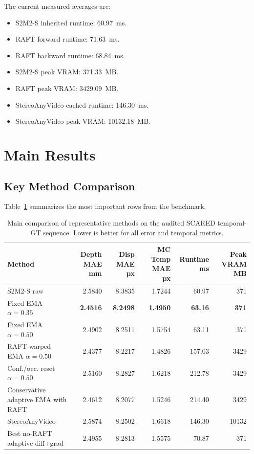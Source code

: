 \documentclass[11pt,a4paper]{article}
\begin{document}
The current measured averages are:

\begin{itemize}[leftmargin=*]
    \item S2M2-S inherited runtime: \SI{60.97}{ms}.
    \item RAFT forward runtime: \SI{71.63}{ms}.
    \item RAFT backward runtime: \SI{68.84}{ms}.
    \item S2M2-S peak VRAM: \SI{371.33}{MB}.
    \item RAFT peak VRAM: \SI{3429.09}{MB}.
    \item StereoAnyVideo cached runtime: \SI{146.30}{ms}.
    \item StereoAnyVideo peak VRAM: \SI{10132.18}{MB}.
\end{itemize}

\section{Main Results}

\subsection{Key Method Comparison}

Table~\ref{tab:main-results} summarizes the most important rows from the benchmark.

\begin{table}[htbp]
\centering
\caption{Main comparison of representative methods on the audited SCARED temporal-GT sequence. Lower is better for all error and temporal metrics.}
\label{tab:main-results}
\small
\begin{tabularx}{\textwidth}{lrrrrr}
\toprule
Method & Depth MAE mm & Disp MAE px & MC Temp MAE px & Runtime ms & Peak VRAM MB \\
\midrule
S2M2-S raw & 2.5840 & 8.3835 & 1.7244 & 60.97 & 371 \\
Fixed EMA $\alpha=0.35$ & \textbf{2.4516} & \textbf{8.2498} & \textbf{1.4950} & \textbf{63.16} & \textbf{371} \\
Fixed EMA $\alpha=0.50$ & 2.4902 & 8.2511 & 1.5754 & 63.11 & 371 \\
RAFT-warped EMA $\alpha=0.50$ & 2.4377 & 8.2217 & 1.4826 & 157.03 & 3429 \\
Conf./occ. reset $\alpha=0.50$ & 2.5160 & 8.2827 & 1.6218 & 212.78 & 3429 \\
Conservative adaptive EMA with RAFT & 2.4612 & 8.2077 & 1.5246 & 214.40 & 3429 \\
StereoAnyVideo & 2.5874 & 8.2502 & 1.6618 & 146.30 & 10132 \\
Best no-RAFT adaptive diff+grad & 2.4955 & 8.2813 & 1.5575 & 70.87 & 371 \\
\bottomrule
\end{tabularx}
\end{table}
\end{document}
